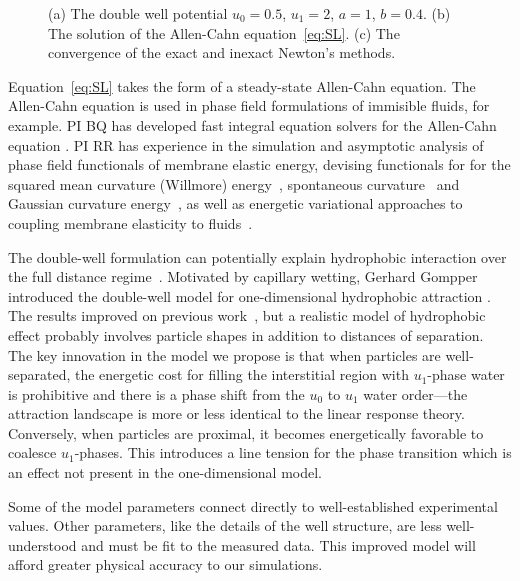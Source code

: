 \begin{figure}
  \vspace{-4pt}
  \centering
   
  \caption{\label{fig:CA} (a) The double well potential $u_0 =
  0.5$, $u_1 = 2$, $a = 1$, $b = 0.4$. (b) The solution of the
  Allen-Cahn equation~\eqref{eq:SL}. (c) The convergence of the exact
  and inexact Newton's methods.}
\end{figure}
Equation~\eqref{eq:SL} takes the form of a steady-state Allen-Cahn
equation. The Allen-Cahn equation is used in phase field formulations of
immisible fluids, for example.
PI BQ has developed fast integral equation solvers for
the Allen-Cahn equation \cite{kro-qua2011, qua2011}.
PI RR has experience in the 
simulation and asymptotic analysis of phase field functionals of
membrane elastic energy, devising functionals for for the squared mean
curvature (Willmore) energy~\cite{0951-7715-18-3-016}, spontaneous
curvature~\cite{Du05} and Gaussian curvature energy~\cite{DuEuler}, as
well as energetic variational approaches to coupling membrane elasticity
to fluids~\cite{QiangDu09}.

The double-well formulation can potentially 
explain hydrophobic interaction over the full distance
regime~\cite{Lum1999, Lin2005, Meyer2006, Ducker2016}.
Motivated by capillary wetting, Gerhard
Gompper introduced the double-well model for one-dimensional
hydrophobic attraction \cite{GoHaKo94}.
The results improved on previous work~\cite{ErLjCl89,MaRa76},
but a realistic model of hydrophobic effect 
probably involves particle shapes in addition to distances of separation.
The key innovation in the model we propose is that when particles are
well-separated, the energetic cost for filling the interstitial region
with $u_1$-phase water is prohibitive and there is a phase shift from
the $u_0$ to $u_1$ water order---the attraction landscape is more or
less identical to the linear response theory. Conversely, when particles
are proximal, it becomes energetically favorable to coalesce
$u_1$-phases. This introduces a line tension for the phase transition
which is an effect not present in the one-dimensional model. 

Some of the model parameters connect directly
to well-established experimental values. Other
parameters, like the details of the well structure,
are less well-understood and must be fit to the measured data.
This improved model will afford greater physical accuracy to
our simulations.

